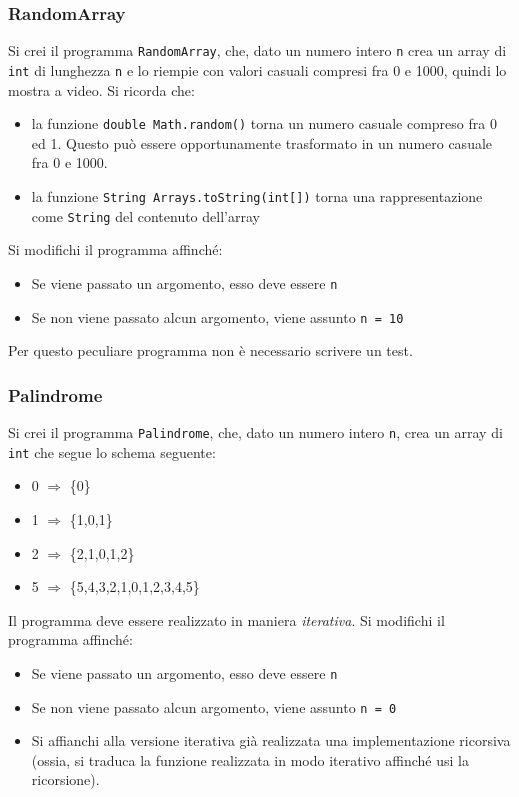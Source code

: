 \documentclass{beamer}
\begin{document}
\begin{frame}
\frametitle{RandomArray}
Si crei il programma \texttt{RandomArray}, che, dato un numero intero \texttt{n} crea un array di \texttt{int} di lunghezza \texttt{n} e lo riempie con valori casuali compresi fra 0 e 1000, quindi lo mostra a video. Si ricorda che:
\begin{itemize}
 \item la funzione \texttt{double Math.random()} torna un numero casuale compreso fra 0 ed 1. Questo può essere opportunamente trasformato in un numero casuale fra 0 e 1000.
 \item la funzione \texttt{String Arrays.toString(int[])} torna una rappresentazione come \texttt{String} del contenuto dell'array
\end{itemize}
Si modifichi il programma affinché:
\begin{itemize}
 \item Se viene passato un argomento, esso deve essere \texttt{n}
 \item Se non viene passato alcun argomento, viene assunto \texttt{n = 10}
\end{itemize}
Per questo peculiare programma non è necessario scrivere un test.
\end{frame}

\begin{frame}
\frametitle{Palindrome}
Si crei il programma \texttt{Palindrome}, che, dato un numero intero \texttt{n}, crea un array di \texttt{int} che segue lo schema seguente:
\begin{itemize}
 \item 0 $\Rightarrow$ \{0\}
 \item 1 $\Rightarrow$ \{1,0,1\}
 \item 2 $\Rightarrow$ \{2,1,0,1,2\}
 \item 5 $\Rightarrow$ \{5,4,3,2,1,0,1,2,3,4,5\}
\end{itemize}
Il programma deve essere realizzato in maniera \emph{iterativa}.
Si modifichi il programma affinché:
\begin{itemize}
 \item Se viene passato un argomento, esso deve essere \texttt{n}
 \item Se non viene passato alcun argomento, viene assunto \texttt{n = 0}
 \item Si affianchi alla versione iterativa già realizzata una implementazione ricorsiva (ossia, si traduca la funzione realizzata in modo iterativo affinché usi la ricorsione).
\end{itemize}
\end{frame}
\end{document}
